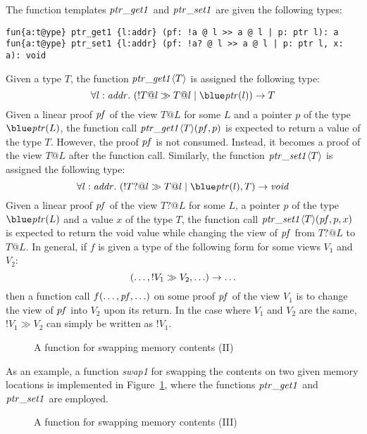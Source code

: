 The function templates ${\it ptr\_get1}$ and ${\it ptr\_set1}$ are given
the following types:
\begin{verbatim}
fun{a:t@ype} ptr_get1 {l:addr} (pf: !a @ l >> a @ l | p: ptr l): a
fun{a:t@ype} ptr_set1 {l:addr} (pf: !a? @ l >> a @ l | p: ptr l, x: a): void
\end{verbatim}
Given a type $T$, the function
${\it ptr\_get1}\langle T\rangle$ is assigned the following type:
\[
\forall l:\saddr.~(!T@l \gg T@l \mid \tptr(l))\timp T
\]
Given a linear proof ${\it pf}$ of the view $T@L$ for some $L$ and a
pointer $p$ of the type $\tptr(L)$, the function call ${\it
ptr\_get1}\langle T\rangle({\it pf}, p)$ is expected to return a
value of the type $T$. However, the proof ${\it pf}$ is not
consumed. Instead, it becomes a proof of the view $T@L$ after the function
call. Similarly, the function
${\it ptr\_set1}\langle T\rangle$ is assigned the following type:
\[
\forall l:\saddr.~(!T?@l \gg T@l \mid \tptr(l), T)\timp\tvoid
\]
Given a linear proof ${\it pf}$ of the view $T?@L$ for some $L$, a pointer
$p$ of the type $\tptr(L)$ and a value $x$ of the type $T$, the function
call ${\it ptr\_set1}\langle T\rangle({\it pf}, p, x)$ is expected to
return the void value while changing the view of ${\it pf}$ from $T?@L$ to
$T@L$.  In general, if $f$ is given a type of the following form for some
views $V_1$ and $V_2$: $$(\ldots,!V_1\gg V_2,\ldots)\rightarrow\ldots$$ then a
function call $f(\ldots,{\it pf},\ldots)$ on some proof ${\it pf}$ of the
view $V_1$ is to change the view of ${\it pf}$ into $V_2$ upon its return.
In the case where $V_1$ and $V_2$ are the same, $!V_1\gg V_2$ can simply be
written as $!V_1$.
\begin{figure}

\caption{A function for swapping memory contents (II)}
\label{figure:swap1_example.dats}
\end{figure}
As an example, a function {\it swap1} for swapping the contents on two
given memory locations is implemented in
Figure~\ref{figure:swap1_example.dats},
where the functions ${\it ptr\_get1}$ and ${\it ptr\_set1}$ are employed.

\begin{figure}

\caption{A function for swapping memory contents (III)}
\end{figure}
